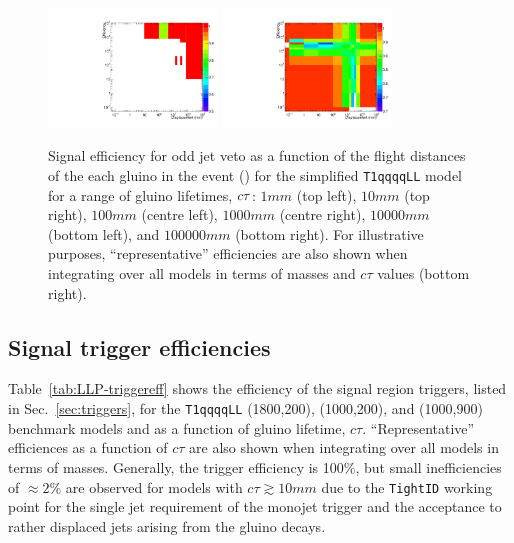 \begin{figure}[h!]
\begin{center}
    \includegraphics[width=0.4\textwidth]{figures/LLPResults/systs/oddjetveto/Signal_SignalModels__longLivedAnalyzer__SMS-T1qqqqLL_ctau_100000_mGluino-1000_mLSP-200_25ns__eff_oddjet_2D_log_num.pdf} 
    \includegraphics[width=0.4\textwidth]{figures/LLPResults/systs/oddjetveto/Signal_SignalModels__longLivedAnalyzer__SMS_T1qqqqLL_ctau-all__eff_oddjet_2D_log_num.pdf} 
    \caption{Signal efficiency for odd jet veto as a function of the
      flight distances of the each gluino in the event
      () for the simplified
      \texttt{T1qqqqLL} model for a range of gluino lifetimes,
      $c\tau$: $1\unit{mm}$ (top left), $10\unit{mm}$ (top right),
      $100\unit{mm}$ (centre left), $1000\unit{mm}$ (centre right),
      $10000\unit{mm}$ (bottom left), and $100000\unit{mm}$ (bottom
      right). For illustrative purposes, ``representative''
      efficiencies are also shown when integrating over all models in
      terms of masses and $c\tau$ values (bottom right). }
    \label{fig:oddjetveto}
  \end{center}
\end{figure}

\clearpage
\subsection{Signal trigger efficiencies}
\label{app:LLP-trigger}

Table~\ref{tab:LLP-triggereff} shows the efficiency of the signal
region triggers, listed in Sec.~\ref{sec:triggers}, for the
\texttt{T1qqqqLL} (1800,200), (1000,200), and (1000,900) benchmark
models and as a function of gluino lifetime, $c\tau$.
``Representative'' efficiences as a function of $c\tau$ are also shown
when integrating over all models in terms of masses. Generally, the
trigger efficiency is 100\%, but small inefficiencies of
${\approx}2\%$ are observed for models with $c\tau \gtrsim
10\unit{mm}$ due to the \verb!TightID! working point for the single
jet requirement of the monojet trigger and the acceptance to rather
displaced jets arising from the gluino decays.

